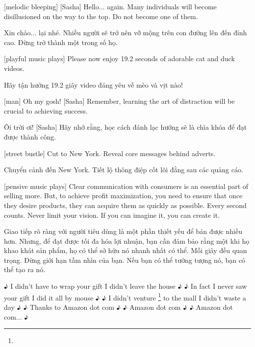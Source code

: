 \documentclass[a4paper]{article}
\begin{document}
	[melodic bleeping]
	[Sasha] Hello... again.
	Many individuals will become disillusioned on the way to the top. Do not become one of them.
	
	\begin{vietnamese-v2}
		 Xin chào... lại nhé. 
		Nhiều người sẽ trở nên vỡ mộng trên con đường lên đến đỉnh cao. Đừng trở thành một trong số họ.
	\end{vietnamese-v2}

	[playful music plays]
	Please now enjoy 19.2 seconds of adorable cat and duck videos.
	
	\begin{vietnamese-v2}
		Hãy tận hưởng 19.2 giây video đáng yêu về mèo và vịt nào!
	\end{vietnamese-v2}
	
	[man] Oh my gosh!
	[Sasha] Remember, learning the art of distraction will be crucial to achieving success.
	
	\begin{vietnamese-v2}
		 Ôi trời ơi! 
		[Sasha] Hãy nhớ rằng, học cách đánh lạc hướng sẽ là chìa khóa để đạt được thành công.
	\end{vietnamese-v2}
	
	
	[street bustle]
	Cut to New York. Reveal core messages behind adverts.
	
	\begin{vietnamese-v2}
		Chuyển cảnh đến New York. Tiết lộ thông điệp cốt lõi đằng sau các quảng cáo.
	\end{vietnamese-v2}
	
	[pensive music plays]
	Clear communication with consumers is an essential part of selling more. But, to achieve profit maximization, you need to ensure that once they desire products, they can acquire them as quickly as possible.
	Every second counts.
	Never limit your vision.
	If you can imagine it, you can create it.
	
	\begin{vietnamese-v2}
		 Giao tiếp rõ ràng với người tiêu dùng là một phần thiết yếu để bán được nhiều hơn. Nhưng, để đạt được tối đa hóa lợi nhuận, bạn cần đảm bảo rằng một khi họ khao khát sản phẩm, họ có thể sở hữu nó nhanh nhất có thể. 
		Mỗi giây đều quan trọng. 
		Đừng giới hạn tầm nhìn của bạn. 
		Nếu bạn có thể tưởng tượng nó, bạn có thể tạo ra nó.
	\end{vietnamese-v2}
	
	
	♪ I didn't have to wrap your gift I didn't leave the house ♪
	♪ In fact I never saw your gift I did it all by mouse ♪
	♪ I didn't venture \footnote{} to the mall I didn't waste a day ♪
	♪ Thanks to Amazon dot com ♪
	♪ Amazon dot com ♪
	♪ Amazon dot com... ♪
	
\end{document}
